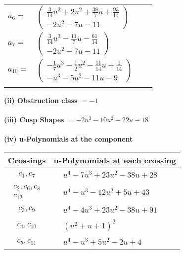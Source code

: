 \documentclass[1p]{elsarticle_modified}
\theoremstyle{definition}
\begin{document}
\begin{tabular}{m{7pt} m{180pt} m{7pt} m{180pt} }
\flushright $a_{6}=$&$\begin{pmatrix}\frac{3}{14} u^3+2 u^2+\frac{38}{7} u+\frac{93}{14}\\-2 u^2-7 u-11\end{pmatrix}$ \\
\flushright $a_{7}=$&$\begin{pmatrix}\frac{3}{14} u^3-\frac{11}{7} u-\frac{61}{14}\\-2 u^2-7 u-11\end{pmatrix}$ \\
\flushright $a_{10}=$&$\begin{pmatrix}-\frac{1}{7} u^3-\frac{1}{2} u^2-\frac{11}{14} u+\frac{1}{14}\\- u^3-5 u^2-11 u-9\end{pmatrix}$\\&\end{tabular}
\flushleft \textbf{(ii) Obstruction class $= -1$}\\~\\
\flushleft \textbf{(iii) Cusp Shapes $= -2 u^3-10 u^2-22 u-18$}\\~\\
\newpage\renewcommand{\arraystretch}{1}
\flushleft \textbf{(iv) u-Polynomials at the component}\newline \\
\begin{tabular}{m{50pt}|m{274pt}}
Crossings & \hspace{64pt}u-Polynomials at each crossing \\
\hline $$\begin{aligned}c_{1},c_{7}\end{aligned}$$&$\begin{aligned}
&u^4-7 u^3+23 u^2-38 u+28
\end{aligned}$\\
\hline $$\begin{aligned}c_{2},c_{6},c_{8}\\c_{12}\end{aligned}$$&$\begin{aligned}
&u^4- u^3-12 u^2+5 u+43
\end{aligned}$\\
\hline $$\begin{aligned}c_{3},c_{9}\end{aligned}$$&$\begin{aligned}
&u^4-4 u^3+23 u^2-38 u+91
\end{aligned}$\\
\hline $$\begin{aligned}c_{4},c_{10}\end{aligned}$$&$\begin{aligned}
&(u^2+u+1)^2
\end{aligned}$\\
\hline $$\begin{aligned}c_{5},c_{11}\end{aligned}$$&$\begin{aligned}
&u^4- u^3+5 u^2-2 u+4
\end{aligned}$\\
\hline
\end{tabular}\\~\\
\end{document}
